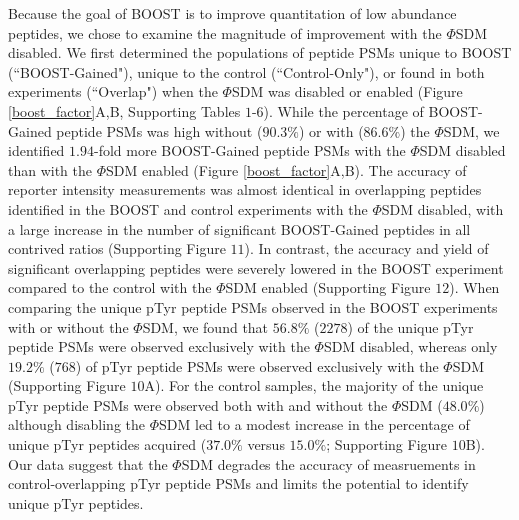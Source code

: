 \documentclass[journal=jprobs,manuscript=article]{achemso}
\begin{document}
Because the goal of BOOST is to improve quantitation of low abundance peptides, we chose to examine the magnitude of improvement with the $\Phi$SDM disabled. We first determined the populations of peptide PSMs unique to BOOST (``BOOST-Gained"), unique to the control (``Control-Only"), or found in both experiments (``Overlap") when the $\Phi$SDM was disabled or enabled (Figure \ref{boost_factor}A,B, Supporting Tables $1$-$6$). While the percentage of BOOST-Gained peptide PSMs was high without ($90.3\%$) or with ($86.6\%$) the $\Phi$SDM, we identified $1.94$-fold more BOOST-Gained peptide PSMs with the $\Phi$SDM disabled than with the $\Phi$SDM enabled (Figure \ref{boost_factor}A,B). The accuracy of reporter intensity measurements was almost identical in overlapping peptides identified in the BOOST and control experiments with the $\Phi$SDM disabled, with a large increase in the number of significant BOOST-Gained peptides in all contrived ratios (Supporting Figure $11$). In contrast, the accuracy and yield of significant overlapping peptides were severely lowered in the BOOST experiment compared to the control with the $\Phi$SDM enabled (Supporting Figure $12$). When comparing the unique pTyr peptide PSMs observed in the BOOST experiments with or without the $\Phi$SDM, we found that $56.8\%$ ($2278$) of the unique pTyr peptide PSMs were observed exclusively with the $\Phi$SDM disabled, whereas only $19.2\%$ ($768$) of pTyr peptide PSMs were observed exclusively with the $\Phi$SDM (Supporting Figure $10$A). For the control samples, the majority of the unique pTyr peptide PSMs were observed both with and without the $\Phi$SDM ($48.0\%$) although disabling the $\Phi$SDM led to a modest increase in the percentage of unique pTyr peptides acquired ($37.0\%$ versus $15.0\%$; Supporting Figure $10$B). Our data suggest that the $\Phi$SDM degrades the accuracy of measruements in control-overlapping pTyr peptide PSMs and limits the potential to identify unique pTyr peptides.
\end{document}
